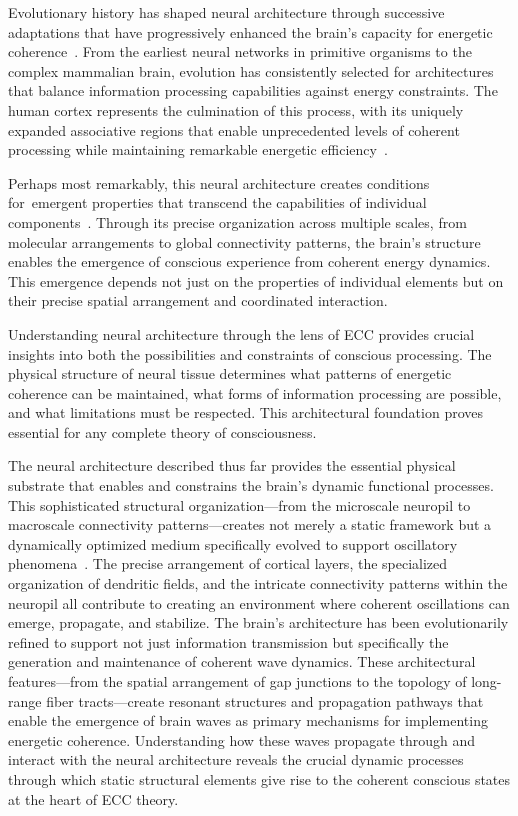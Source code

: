 Evolutionary history has shaped neural architecture through successive adaptations that have progressively enhanced the brain's capacity for energetic coherence~\cite{Striedter2016, Northcutt2012}. From the earliest neural networks in primitive organisms to the complex mammalian brain, evolution has consistently selected for architectures that balance information processing capabilities against energy constraints. The human cortex represents the culmination of this process, with its uniquely expanded associative regions that enable unprecedented levels of coherent processing while maintaining remarkable energetic efficiency~\cite{Herculano-Houzel2010}.

Perhaps most remarkably, this neural architecture creates conditions for~emergent properties that transcend the capabilities of individual components~\cite{vonBartheld2016, breakspear2005dynamics}. Through its precise organization across multiple scales, from molecular arrangements to global connectivity patterns, the brain's structure enables the emergence of conscious experience from coherent energy dynamics. This emergence depends not just on the properties of individual elements but on their precise spatial arrangement and coordinated interaction.

Understanding neural architecture through the lens of ECC provides crucial insights into both the possibilities and constraints of conscious processing. The physical structure of neural tissue determines what patterns of energetic coherence can be maintained, what forms of information processing are possible, and what limitations must be respected. This architectural foundation proves essential for any complete theory of consciousness.

The neural architecture described thus far provides the essential physical substrate that enables and constrains the brain's dynamic functional processes. This sophisticated structural organization—from the microscale neuropil to macroscale connectivity patterns—creates not merely a static framework but a dynamically optimized medium specifically evolved to support oscillatory phenomena~\cite{Buzsaki2006, Varela2001}. The precise arrangement of cortical layers, the specialized organization of dendritic fields, and the intricate connectivity patterns within the neuropil all contribute to creating an environment where coherent oscillations can emerge, propagate, and stabilize. The brain's architecture has been evolutionarily refined to support not just information transmission but specifically the generation and maintenance of coherent wave dynamics. These architectural features—from the spatial arrangement of gap junctions to the topology of long-range fiber tracts—create resonant structures and propagation pathways that enable the emergence of brain waves as primary mechanisms for implementing energetic coherence. Understanding how these waves propagate through and interact with the neural architecture reveals the crucial dynamic processes through which static structural elements give rise to the coherent conscious states at the heart of ECC theory.
